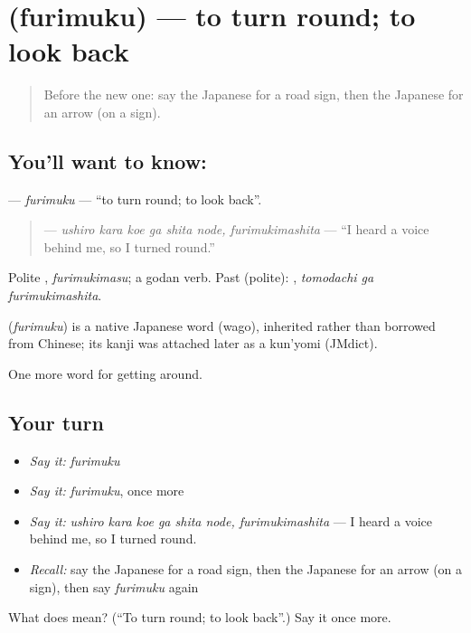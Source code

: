 \section[\texorpdfstring{\ja{ふりむく} (furimuku)}{ふりむく (furimuku)}]{ (furimuku) — to turn round; to look back}

\label{lesson:JA-C393-furimuku}



\begin{quote}
Before the new one: say the Japanese for a road sign, then the Japanese for an arrow (on a sign).
\end{quote}

\subsection*{You'll want to know: }
\textbf{} — \emph{furimuku} — \textquotedblleft{}to turn round; to look back\textquotedblright{}.

\begin{quote}
\textbf{  } — \emph{ushiro kara koe ga shita node, furimukimashita} — \textquotedblleft{}I heard a voice behind me, so I turned round.\textquotedblright{}
\end{quote}

Polite \textbf{}, \emph{furimukimasu}; a godan verb. Past (polite): \textbf{ }, \emph{tomodachi ga furimukimashita}.

\begin{cousinweb}
\textbf{} (\emph{furimuku}) is a native Japanese word (wago), inherited rather than borrowed from Chinese; its kanji was attached later as a kun'yomi (JMdict).
\end{cousinweb}

\begin{grammarlens}[title={What you've built}]
One more word for getting around.
\end{grammarlens}

\subsection*{Your turn}
\begin{itemize}
\raggedright
  \item \emph{Say it:} \emph{furimuku}
  \item \emph{Say it:} \emph{furimuku}, once more
  \item \emph{Say it:} \emph{ushiro kara koe ga shita node, furimukimashita} — I heard a voice behind me, so I turned round.
  \item \emph{Recall:} say the Japanese for a road sign, then the Japanese for an arrow (on a sign), then say \emph{furimuku} again
\end{itemize}

\begin{tcolorbox}[breakable,colback=teal!4,colframe=teal!35!black,title={Before you move on}]
What does  mean? (\textquotedblleft{}To turn round; to look back\textquotedblright{}.) Say it once more.
\end{tcolorbox}
